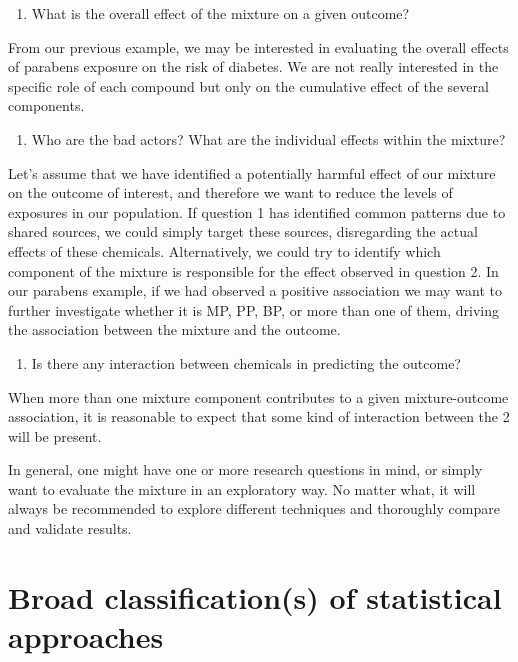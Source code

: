 \documentclass[
]{book}
\providecommand{\tightlist}{%
  \setlength{\itemsep}{0pt}\setlength{\parskip}{0pt}}
\begin{document}
\begin{enumerate}
\def\labelenumi{\arabic{enumi}.}
\setcounter{enumi}{1}
\tightlist
\item
  What is the overall effect of the mixture on a given outcome?
\end{enumerate}

From our previous example, we may be interested in evaluating the overall effects of parabens exposure on the risk of diabetes. We are not really interested in the specific role of each compound but only on the cumulative effect of the several components.

\begin{enumerate}
\def\labelenumi{\arabic{enumi}.}
\setcounter{enumi}{2}
\tightlist
\item
  Who are the bad actors? What are the individual effects within the mixture?
\end{enumerate}

Let's assume that we have identified a potentially harmful effect of our mixture on the outcome of interest, and therefore we want to reduce the levels of exposures in our population. If question 1 has identified common patterns due to shared sources, we could simply target these sources, disregarding the actual effects of these chemicals. Alternatively, we could try to identify which component of the mixture is responsible for the effect observed in question 2. In our parabens example, if we had observed a positive association we may want to further investigate whether it is MP, PP, BP, or more than one of them, driving the association between the mixture and the outcome.

\begin{enumerate}
\def\labelenumi{\arabic{enumi}.}
\setcounter{enumi}{3}
\tightlist
\item
  Is there any interaction between chemicals in predicting the outcome?
\end{enumerate}

When more than one mixture component contributes to a given mixture-outcome association, it is reasonable to expect that some kind of interaction between the 2 will be present.

In general, one might have one or more research questions in mind, or simply want to evaluate the mixture in an exploratory way. No matter what, it will always be recommended to explore different techniques and thoroughly compare and validate results.

\hypertarget{broad-classifications-of-statistical-approaches}{%
\section{Broad classification(s) of statistical approaches}\label{broad-classifications-of-statistical-approaches}}
\end{document}
